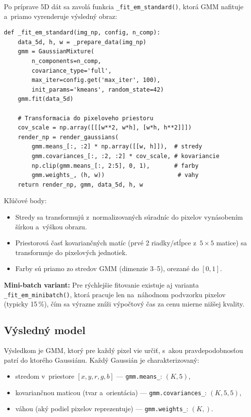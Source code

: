 \documentclass[a4paper,11pt]{article}
\begin{document}
Po príprave 5D dát sa zavolá funkcia \texttt{\_fit\_em\_standard()},
ktorá GMM nafituje a~priamo vyrenderuje výsledný obraz:

\begin{lstlisting}
def _fit_em_standard(img_np, config, n_comp):
    data_5d, h, w = _prepare_data(img_np)
    gmm = GaussianMixture(
        n_components=n_comp,
        covariance_type='full',
        max_iter=config.get('max_iter', 100),
        init_params='kmeans', random_state=42)
    gmm.fit(data_5d)

    # Transformacia do pixeloveho priestoru
    cov_scale = np.array([[[w**2, w*h], [w*h, h**2]]])
    render_np = render_gaussians(
        gmm.means_[:, :2] * np.array([[w, h]]),  # stredy
        gmm.covariances_[:, :2, :2] * cov_scale, # kovariancie
        np.clip(gmm.means_[:, 2:5], 0, 1),       # farby
        gmm.weights_, (h, w))                     # vahy
    return render_np, gmm, data_5d, h, w
\end{lstlisting}

\noindent
Kľúčové body:
\begin{itemize}[nosep]
  \item Stredy sa transformujú z~normalizovaných súradníc do pixelov
        vynásobením šírkou a~výškou obrazu.
  \item Priestorová časť kovariančných matíc (prvé 2 riadky/stĺpce
        z~$5 \times 5$ matice) sa transformuje do pixelových jednotiek.
  \item Farby sú priamo zo stredov GMM (dimenzie 3--5), orezané do $[0, 1]$.
\end{itemize}

\textbf{Mini-batch variant:} Pre rýchlejšie fitovanie existuje aj
varianta \texttt{\_fit\_em\_minibatch()}, ktorá pracuje len na~náhodnom
podvzorku pixelov (typicky 15\,\%), čím sa výrazne zníži výpočtový čas
za cenu mierne nižšej kvality.

\subsection{Výsledný model}

Výsledkom je GMM, ktorý pre každý pixel vie určiť, s~akou pravdepodobnosťou
patrí do ktorého Gaussiánu.  Každý Gaussián je charakterizovaný:
\begin{itemize}[nosep]
  \item stredom v~priestore $[x, y, r, g, b]$ --- \texttt{gmm.means\_}: $(K, 5)$,
  \item kovariančnou maticou (tvar a~orientácia) --- \texttt{gmm.covariances\_}: $(K, 5, 5)$,
  \item váhou (aký podiel pixelov reprezentuje) --- \texttt{gmm.weights\_}: $(K,)$.
\end{itemize}
\end{document}
